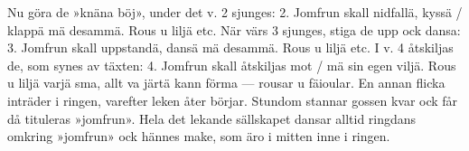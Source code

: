 Nu göra de »knäna böj», under det v. 2 sjunges:
2.  Jomfrun skall nidfallä, { kyssä / klappä } mä desammä.
    Rous u liljä etc.
    När värs 3 sjunges, stiga de upp ock dansa:
3.  Jomfrun skall uppstandä, dansä mä desammä.
    Rous u liljä etc.
    I v. 4 åtskiljas de, som synes av täxten:
4.  Jomfrun skall åtskiljas { mot / mä } sin egen viljä.
    Rous u liljä varjä sma,
    allt va järtä kann förma —
    rousar u fäioular.
    En annan flicka inträder i ringen, varefter leken åter börjar.
    Stundom stannar gossen kvar ock får då tituleras »jomfrun».
    Hela det lekande sällskapet dansar alltid ringdans omkring
    »jomfrun» ock hännes make, som äro i mitten inne i ringen.

